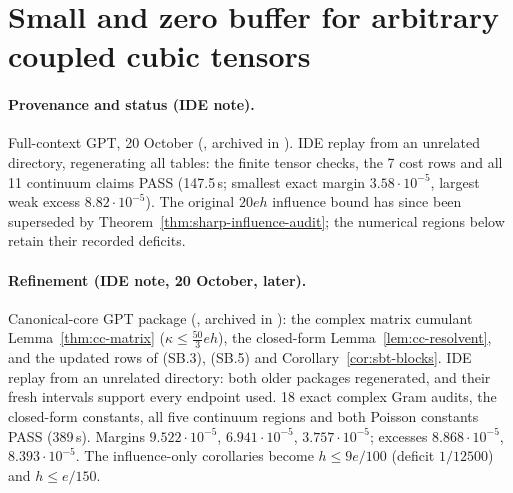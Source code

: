 \section{Small and zero buffer for arbitrary coupled cubic tensors}\label{ch:small-buffer-tensors}

\paragraph{Provenance and status (IDE note).} Full-context GPT, 20 October (, archived in
). IDE replay  from an unrelated directory, regenerating all tables: the finite tensor
checks, the 7 cost rows and all 11 continuum claims PASS (147.5\,s; smallest exact margin $3.58\cdot10^{-5}$, largest weak excess $8.82\cdot10^{-5}$). The original $20eh$ influence bound has since been superseded by Theorem~\ref{thm:sharp-influence-audit}; the numerical regions below retain their recorded deficits.

\paragraph{Refinement (IDE note, 20 October, later).} Canonical-core GPT package (, archived in
): the complex matrix cumulant Lemma~\ref{thm:cc-matrix} ($\kappa\le\frac{50}3eh$), the closed-form
Lemma~\ref{lem:cc-resolvent}, and the updated rows of (SB.3), (SB.5) and Corollary~\ref{cor:sbt-blocks}. IDE replay  from an unrelated directory: both older packages regenerated, and their fresh intervals support every endpoint used. 18 exact complex Gram
audits, the closed-form constants, all five continuum regions and both Poisson constants PASS (389\,s). Margins $9.522\cdot10^{-5}$, $6.941\cdot10^{-5}$,
$3.757\cdot10^{-5}$; excesses $8.868\cdot10^{-5}$, $8.393\cdot10^{-5}$. The influence-only corollaries become $h\le9e/100$ (deficit $1/12500$) and $h\le e/150$.

